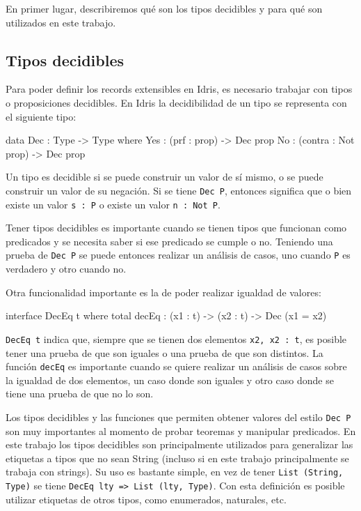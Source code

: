 En primer lugar, describiremos qué son los tipos decidibles y para qué son utilizados en este trabajo.

\subsection{Tipos decidibles}

Para poder definir los records extensibles en Idris, es necesario trabajar con tipos o proposiciones decidibles. En Idris la decidibilidad de un tipo se representa con el siguiente tipo:

\begin{code}
data Dec : Type -> Type where
  Yes : (prf : prop) -> Dec prop
  No : (contra : Not prop) -> Dec prop
\end{code}

Un tipo es decidible si se puede construir un valor de sí mismo, o se puede construir un valor de su negación. Si se tiene \texttt{Dec P}, entonces significa que o bien existe un valor \texttt{s : P} o existe un valor \texttt{n : Not P}.

Tener tipos decidibles es importante cuando se tienen tipos que funcionan como predicados y se necesita saber si ese predicado se cumple o no. Teniendo una prueba de \texttt{Dec P} se puede entonces realizar un análisis de casos, uno cuando \texttt{P} es verdadero y otro cuando no.

Otra funcionalidad importante es la de poder realizar igualdad de valores:

\begin{code}
interface DecEq t where
  total decEq : (x1 : t) -> (x2 : t) -> Dec (x1 = x2)
\end{code}

\texttt{DecEq t} indica que, siempre que se tienen dos elementos \texttt{x2, x2 : t}, es posible tener una prueba de que son iguales o una prueba de que son distintos. La función \texttt{decEq} es importante cuando se quiere realizar un análisis de casos sobre la igualdad de dos elementos, un caso donde son iguales y otro caso donde se tiene una prueba de que no lo son.

Los tipos decidibles y las funciones que permiten obtener valores del estilo \texttt{Dec P} son muy importantes al momento de probar teoremas y manipular predicados. En este trabajo los tipos decidibles son principalmente utilizados para generalizar las etiquetas a tipos que no sean String (incluso si en este trabajo principalmente se trabaja con strings). Su uso es bastante simple, en vez de tener \texttt{List (String, Type)} se tiene \texttt{DecEq lty => List (lty, Type)}. Con esta definición es posible utilizar etiquetas de otros tipos, como enumerados, naturales, etc.

